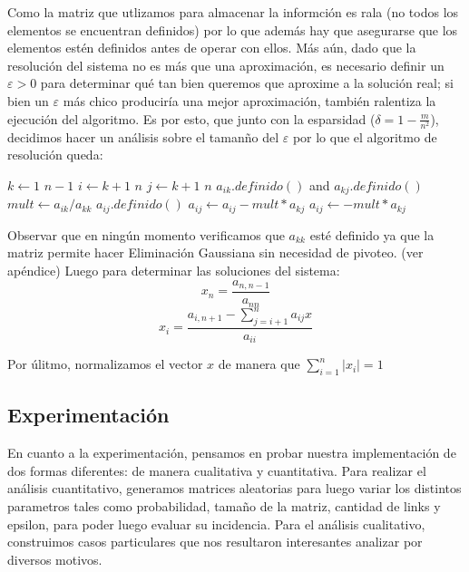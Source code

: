 \par Como la matriz que utlizamos para almacenar la informci\'on es rala (no todos los elementos se encuentran definidos) por lo que 
adem\'as hay que asegurarse que los elementos est\'en definidos antes de operar con ellos. M\'as a\'un, dado que la resoluci\'on
del sistema no es m\'as que una aproximaci\'on, es necesario definir un $\varepsilon > 0$ para determinar qu\'e tan bien queremos que 
aproxime a la soluci\'on real; si bien un $\varepsilon$ m\'as chico producir\'ia una mejor aproximaci\'on, tambi\'en ralentiza la
ejecuci\'on del algoritmo. Es por esto, que junto con la esparsidad ($\delta = 1 - \frac{m}{n^2}$), decidimos hacer un an\'alisis
sobre el taman\~no del $\varepsilon$ por lo que el algoritmo de resoluci\'on queda:

\begin{codebox}\label{elimGaussRala}
\li \For $k \gets 1$ \To $n-1$
    \Do
\li     \For $i \gets k+1$ \To $n$
            \Do
\li         \For $j \gets k+1$ \To $n$
                \Do
\li                \If $a_{ik}.definido()$ and $a_{kj}.definido()$
                        \Then
\li                        $mult \gets a_{ik}/a_{kk}$
\li                     \If $a_{ij}.definido()$
                            \Then
\li                          $a_{ij} \gets a_{ij} - mult*a_{kj}$
\li                     \Else
\li                          $a_{ij} \gets - mult*a_{kj}$
                \End
            \End
        \End
\end{codebox}
Observar que en ning\'un momento verificamos que $a_{kk}$ est\'e definido ya que la matriz permite hacer Eliminación Gaussiana sin necesidad
de pivoteo. (ver ap\'endice)
Luego para determinar las soluciones del sistema\cite{burden}:
\[
    x_n = \frac{a_{n,n-1}}{a_{nn}}
    \]
    \[
    x_i = \frac {a_{i,n+1} - \sum_{j=i+1}^{n} a_{ij}x} {a_{ii}}
    \]

Por \'ulitmo, normalizamos el vector $x$ de manera que $\sum^{n}_{i=1} |x_i| = 1$
\subsection*{Experimentaci\'on}
\par
En cuanto a la experimentaci\'on, pensamos en probar nuestra implementaci\'on de dos formas diferentes: de manera cualitativa y cuantitativa.
Para realizar el an\'alisis cuantitativo, generamos matrices aleatorias para luego variar los distintos parametros tales como probabilidad, 
tamaño de la matriz, cantidad de links y epsilon, para poder luego evaluar su incidencia. Para el an\'alisis cualitativo, construimos casos particulares
que nos resultaron interesantes analizar por diversos motivos.

